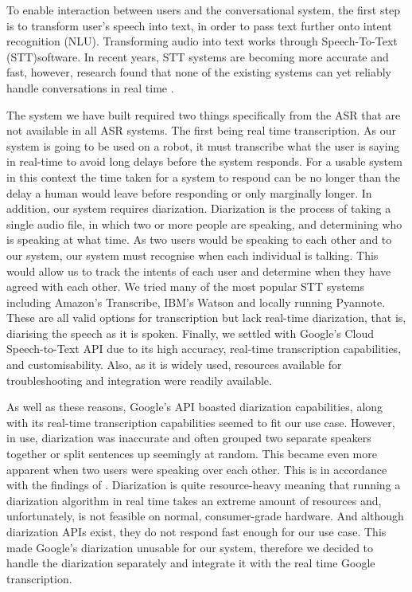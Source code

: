 \documentclass[hidelinks, 11pt]{article}
\begin{document}
To enable interaction between users and the conversational system, the first step is to transform user's speech into text, in order to pass text further onto intent recognition (NLU). Transforming audio into text works through Speech-To-Text (STT)software. In recent years, STT systems are becoming more accurate and fast, however, research found that none of the existing systems can yet reliably handle conversations in real time \cite{Addlesee_Yu_Eshghi_2020}.

The system we  have built required two things specifically from the ASR that are not available in all ASR systems. The first being real time transcription. As our system is going to be used on a robot, it must transcribe what the user is saying in real-time to avoid long delays before the system responds. For a usable system in this context the time taken for a system to respond can be no longer than the delay a human would leave before responding or only marginally longer. In addition, our system requires diarization. Diarization is the process of taking a single audio file, in which two or more people are speaking, and determining who is speaking at what time. As two users would be speaking to each other and to our system, our system must recognise when each individual is talking.  This would allow us to track the intents of each user and determine when they have agreed with each other.
We tried many of the most popular STT systems including Amazon's Transcribe, IBM's Watson and locally running Pyannote. These are all valid options for transcription but lack real-time diarization, that is, diarising the speech as it is spoken.
Finally, we  settled with Google's Cloud Speech-to-Text API due to its high accuracy, real-time transcription capabilities, and customisability. Also, as it is widely used, resources available for troubleshooting and integration were readily available.

As well as these reasons, Google's API boasted diarization capabilities, along with its real-time transcription capabilities seemed to fit our use case. However, in use, diarization was inaccurate and often grouped two separate speakers together or split sentences up seemingly at random. This became even more apparent when two users were speaking over each other. This is in accordance with the findings of \cite{addlesee_comprehensive_2020}. Diarization is quite resource-heavy meaning that running a diarization algorithm in real time takes an extreme amount of resources and, unfortunately, is not feasible on normal, consumer-grade hardware. And although diarization APIs exist, they do not respond fast enough for our use case. This made Google's diarization unusable for our system, therefore we decided to handle the diarization separately and integrate it with the real time Google transcription.
\end{document}
